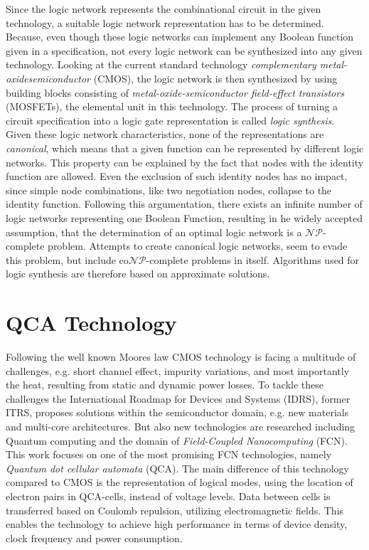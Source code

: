 Since the logic network represents the combinational circuit in the given technology, a suitable logic network representation has to be determined. Because, even though these logic networks can implement any Boolean function given in a specification, not every logic network can be synthesized into any given technology.
Looking at the current standard technology \textit{complementary metal-oxidesemiconductor} (CMOS), the logic network is then synthesized by using building blocks consisting of \textit{metal-oxide-semiconductor field-effect transistors} (MOSFETs), the elemental unit in this technology. The process of turning a circuit specification into a logic gate representation is called \textit{logic synthesis}.\\

Given these logic network characteristics, none of the representations are \textit{canonical}, which means that a given function can be represented by different logic networks. This property can be explained by the fact that nodes with the identity function are allowed. Even the exclusion of such identity nodes has no impact, since simple node combinations, like two negotiation nodes, collapse to the identity function. Following this argumentation, there exists an infinite number of logic networks representing one Boolean Function, resulting in he widely accepted assumption, that the determination of an optimal logic network is a $\mathcal{NP}$-complete problem. Attempts to create canonical logic networks, seem to evade this problem, but include co$\mathcal{NP}$-complete problems in itself. Algorithms used for logic synthesis are therefore based on approximate solutions.


\section{QCA Technology}

Following the well known Moores law CMOS technology is facing a multitude of challenges, e.g. short channel effect, impurity variations, and most importantly the heat, resulting from static and dynamic power losses. To tackle these challenges the International Roadmap for Devices and Systems (IDRS), former ITRS, proposes solutions within the semiconductor domain, e.g. new materials and multi-core architectures. But also new technologies are researched including Quantum computing and the domain of \textit{Field-Coupled Nanocomputing} (FCN). This work focuses on one of the most promising FCN technologies, namely \textit{Quantum dot cellular automata} (QCA). The main difference of this technology compared to CMOS is the representation of logical modes, using the location of electron pairs in QCA-cells, instead of voltage levels. Data between cells is transferred based on Coulomb repulsion, utilizing electromagnetic fields. This enables the technology to achieve high performance in terms of device density, clock frequency and power consumption.

